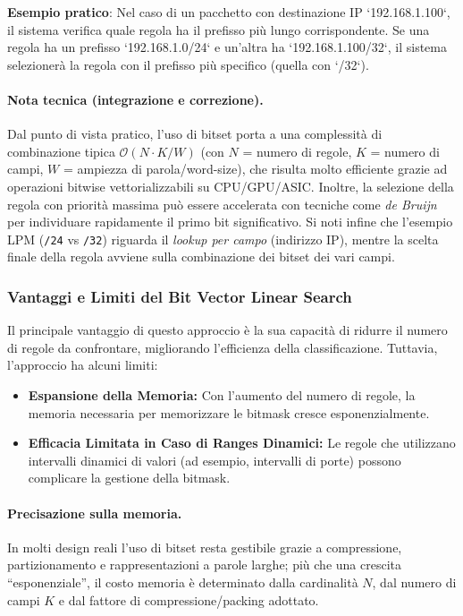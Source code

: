 \textbf{Esempio pratico}:
Nel caso di un pacchetto con destinazione IP `192.168.1.100`, il sistema verifica quale regola ha il prefisso più lungo corrispondente. Se una regola ha un prefisso `192.168.1.0/24` e un'altra ha `192.168.1.100/32`, il sistema selezionerà la regola con il prefisso più specifico (quella con `/32`).

\paragraph{Nota tecnica (integrazione e correzione).}
Dal punto di vista pratico, l’uso di bitset porta a una complessità di combinazione tipica \(\mathcal{O}(N \cdot K / W)\) (con \(N\) = numero di regole, \(K\) = numero di campi, \(W\) = ampiezza di parola/word-size), che risulta molto efficiente grazie ad operazioni bitwise vettorializzabili su CPU/GPU/ASIC. Inoltre, la selezione della regola con priorità massima può essere accelerata con tecniche come \emph{de Bruijn} per individuare rapidamente il primo bit significativo. Si noti infine che l’esempio LPM (\texttt{/24} vs \texttt{/32}) riguarda il \emph{lookup per campo} (indirizzo IP), mentre la scelta finale della regola avviene sulla combinazione dei bitset dei vari campi.

\subsubsection{Vantaggi e Limiti del Bit Vector Linear Search}
Il principale vantaggio di questo approccio è la sua capacità di ridurre il numero di regole da confrontare, migliorando l'efficienza della classificazione. Tuttavia, l'approccio ha alcuni limiti:
\begin{itemize}
  \item \textbf{Espansione della Memoria:} Con l'aumento del numero di regole, la memoria necessaria per memorizzare le bitmask cresce esponenzialmente.
  \item \textbf{Efficacia Limitata in Caso di Ranges Dinamici:} Le regole che utilizzano intervalli dinamici di valori (ad esempio, intervalli di porte) possono complicare la gestione della bitmask.
\end{itemize}

\paragraph{Precisazione sulla memoria.}
In molti design reali l’uso di bitset resta gestibile grazie a compressione, partizionamento e rappresentazioni a parole larghe; più che una crescita “esponenziale”, il costo memoria è determinato dalla cardinalità \(N\), dal numero di campi \(K\) e dal fattore di compressione/packing adottato.


